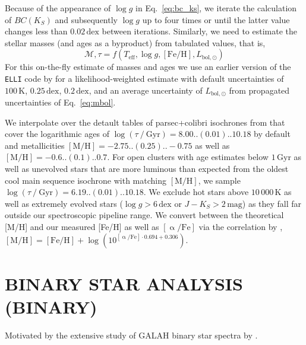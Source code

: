 \documentclass[
  journal=pasa,
  manuscript=research-paper, %
  year=2023,
  volume=37
]{cup-journal}
\begin{document}
Because of the appearance of $\log g$ in Eq.~\ref{eq:bc_ks}, we iterate the calculation of $BC(K_S)$ and subsequently $\log g$ up to four times or until the latter value changes less than $0.02\,\mathrm{dex}$ between iterations. Similarly, we need to estimate the stellar masses (and ages as a byproduct) from tabulated values, that is,
\begin{equation}
\mathcal{M}, \tau = f(T_\mathrm{eff}, \log g, \mathrm{[Fe/H]}, L_\mathrm{bol,\odot})
\label{eq:mass_age}
\end{equation}
For this on-the-fly estimate of masses and ages we use an earlier version of the \texttt{ELLI} code by \cite{Lin2018} for a likelihood-weighted estimate with default uncertainties of $100\,\mathrm{K}$, $0.25\,\mathrm{dex}$, $0.2\,\mathrm{dex}$, and an average uncertainty of $L_\mathrm{bol,\odot}$ from propagated uncertainties of Eq.~\ref{eq:mbol}.

We interpolate over the detault tables of {\sc parsec+colibri} isochrones \citep{Bressan2012, Marigo2017} from that cover the logarithmic ages of $\log (\tau~/~\mathrm{Gyr}) = 8.00..(0.01)..10.18$ by default and metallicities $\mathrm{[M/H]} = -2.75..(0.25)..-0.75$ as well as $\mathrm{[M/H]} = -0.6..(0.1)..0.7$. For open clusters with age estimates below $1\,\mathrm{Gyr}$ as well as unevolved stars that are more luminous than expected from the oldest cool main sequence isochrone with matching $\mathrm{[M/H]}$, we sample $\log (\tau~/~\mathrm{Gyr}) = 6.19..(0.01)..10.18$. We exclude hot stars above $10\,000\,\mathrm{K}$ as well as extremely evolved stars ($\log g > 6\,\mathrm{dex}$ or $J - K_S > 2\,\mathrm{mag}$) as they fall far outside our spectroscopic pipeline range. We convert between the theoretical [M/H] and our measured [Fe/H] as well as $\mathrm{[\upalpha/Fe]}$ via the correlation by \citet{Salaris2006}, $\mathrm{[M/H]} = \mathrm{[Fe/H]} + \log\left(10^{\mathrm{[\upalpha/Fe]} \cdot 0.694 + 0.306} \right)$.

\section{BINARY STAR ANALYSIS (BINARY)}
\label{sec:binary_analysis}


Motivated by the extensive study of GALAH binary star spectra by \citet{Traven2020}.
\end{document}
